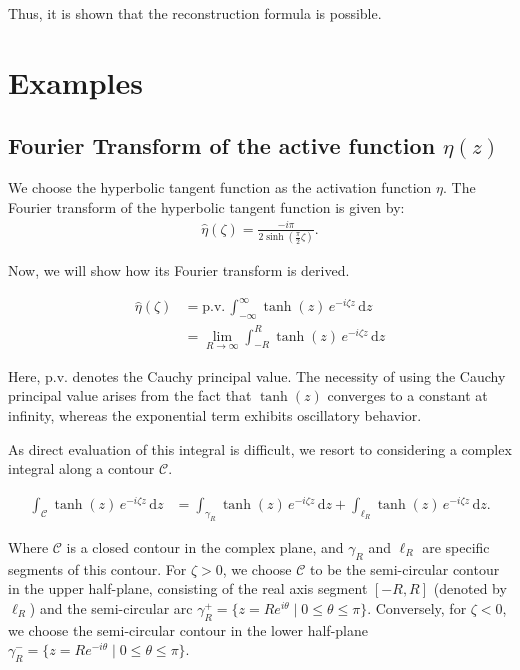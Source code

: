 \documentclass[a4paper,12pt]{article}
\newcommand{\intinf}{\int_{-\infty}^{\infty}}
\newcommand{\z}{\zeta}
\newcommand{\dd}{\mathrm{d}}
\newcommand{\etahat}{\widehat{\eta}}
\begin{document}
Thus, it is shown that the reconstruction formula is possible.

\clearpage


\section{Examples}
\subsection{Fourier Transform of the active function $\eta(z)$}

We choose the hyperbolic tangent function as the activation function $\eta$.
The Fourier transform of the hyperbolic tangent function is given by:
\begin{align}
  \etahat(\z) = \frac{-i \pi}{2\sinh\left(\frac{\pi}{2} \z\right)}.
\end{align}

Now, we will show how its Fourier transform is derived.

\begin{align*}
  \etahat(\z) &= \text{p.v.}\, \intinf \tanh(z) \, e^{-i\z z} \, \dd z \\
  &= \lim_{R \to \infty} \int_{-R}^{R} \tanh(z) \, e^{-i\z z} \, \dd z 
\end{align*}

Here, p.v. denotes the Cauchy principal value. The necessity of using the Cauchy principal value arises from the fact that $\tanh(z)$ converges to a constant at infinity, whereas the exponential term exhibits oscillatory behavior.

As direct evaluation of this integral is difficult, we resort to considering a complex integral along a contour $\mathcal{C}$.

\begin{align*}
  \int_{\mathcal{C}} \tanh(z) \, e^{-i\z z} \, \dd z &= \int_{\gamma_R} \tanh(z) \, e^{-i\z z} \, \dd z + \int_{\ell_R} \tanh(z) \, e^{-i\z z} \, \dd z.
\end{align*}

Where $\mathcal{C}$ is a closed contour in the complex plane, and $\gamma_R$ and $\ell_R$ are specific segments of this contour. For $\zeta > 0$, we choose $\mathcal{C}$ to be the semi-circular contour in the upper half-plane,
consisting of the real axis segment $[-R, R]$ (denoted by $\ell_R$) and the semi-circular arc $\gamma^+_R = \{ z = R e^{i\theta} \mid 0 \leq \theta \leq \pi \}$. Conversely, for $\zeta < 0$,
we choose the semi-circular contour in the lower half-plane $\gamma^-_R = \{ z = R e^{-i\theta} \mid 0 \leq \theta \leq \pi \}$.
\end{document}

